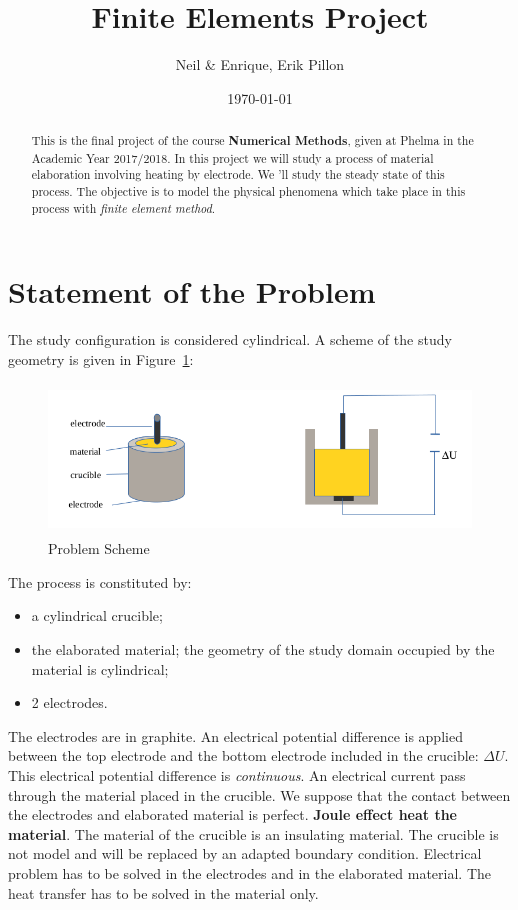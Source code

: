 \documentclass{article}
\date{\today}
\author{Neil \& Enrique, Erik Pillon}
\title{Finite Elements Project}
\begin{document}
\maketitle
\begin{abstract}
	This is the final project of the course \textbf{Numerical Methods}, given at Phelma in the Academic Year 2017/2018. In this project we will study a process of material elaboration involving heating by electrode. We 'll study the steady state of this process. The objective is to model the physical phenomena which take place in this process with \emph{finite element method}.
\end{abstract}
\section{Statement of the Problem}
The study configuration is considered cylindrical. A scheme of the study geometry is given in Figure~\ref{figure:problem}:
\begin{figure}
	\centering
	\includegraphics[height=4cm]{Images/problem.png}
	\caption{Problem Scheme}
	\label{figure:problem}
\end{figure}
The process is constituted by:
\begin{itemize}
	\item a cylindrical crucible;
	\item the elaborated material; the geometry of the study domain occupied by the material is cylindrical;
	\item 2 electrodes.
\end{itemize}

The electrodes are in graphite. An electrical potential difference is applied between the top electrode and the bottom electrode included in the crucible: $ \Delta U $. This electrical potential difference is \emph{continuous}. An electrical current pass through the material placed in the crucible. We suppose that the contact between the electrodes and elaborated material is perfect. \textbf{Joule effect heat the material}. The material of the crucible is an insulating material. The crucible is not model and will be replaced by an adapted boundary condition. Electrical problem has to be solved in the electrodes and in the elaborated material. The heat transfer has to be solved in the material only.
\end{document}
